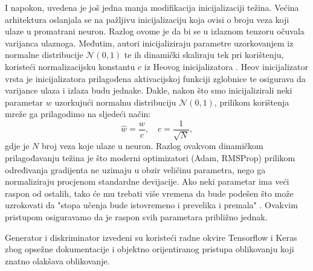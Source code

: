 I napokon, uvedena je još jedna manja modifikacija inicijalizaciji težina. Većina arhitektura oslanjala se na pažljivu inicijalizaciju koja ovisi o broju veza koji ulaze u promatrani neuron. Razlog ovome je da bi se u izlaznom tenzoru očuvala varijanca ulaznoga. Međutim, autori inicijaliziraju parametre uzorkovanjem iz normalne distribucije $\mathcal{N}(0, 1)$ te ih dinamički skaliraju tek pri korištenju, koristeći normalizacijsku konstantu $c$ iz Heovog inicijalizatora \citep{he2015init}. Heov inicijalizator vrsta je inicijalizatora prilagođena aktivacijskoj funkciji zglobnice te osigurava da varijance ulaza i izlaza budu jednake. Dakle, nakon što smo inicijalizirali neki parametar $w$ uzorkujući normalnu distribuciju $\mathcal{N}(0, 1)$, prilikom korištenja mreže ga prilagodimo na sljedeći način:
\begin{equation*}
	\hat{w} = \frac{w}{c}, \quad c = \frac{1}{\sqrt{N}},
\end{equation*}
gdje je $N$ broj veza koje ulaze u neuron. Razlog ovakvom dinamičkom prilagođavanju težina je što moderni optimizatori (Adam, RMSProp) prilikom određivanja gradijenta ne uzimaju u obzir veličinu parametra, nego ga normaliziraju procjenom standardne devijacije. Ako neki parametar ima veći raspon od ostalih, tako će mu trebati više vremena da bude podešen što može uzrokovati da "stopa učenja bude istovremeno i prevelika i premala" \citep{karras2017progressive}. Ovakvim pristupom osiguravamo da je raspon svih parametara približno jednak.

Generator i diskriminator izvedeni su koristeći radne okvire Tensorflow \citep{tensorflow2015-whitepaper} i Keras \citep{chollet2015keras} zbog opsežne dokumentacije i objektno orijentiranog pristupa oblikovanju koji znatno olakšava oblikovanje.
